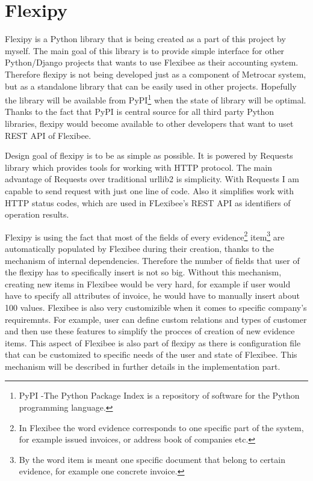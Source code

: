 \documentclass[11pt,twoside,a4paper]{book}
\begin{document}
\section{Flexipy}
Flexipy is a Python library that is being created as a part of this project by myself. The main goal of this library is to provide simple interface for other Python/Django projects that wants to use Flexibee as their accounting system. Therefore flexipy is not being developed just as a component of Metrocar system, but as a standalone library that can be easily used in other projects. Hopefully the library will be available from PyPI\footnote{PyPI -The Python Package Index is a repository of software for the Python programming language.} when the state of library will be optimal. Thanks to the fact that PyPI is central source for all third party Python libraries, flexipy would become available to other developers that want to uset REST API of Flexibee. 

Design goal of flexipy is to be as simple as possible. It is powered by Requests library\cite{requests} which provides tools for working with HTTP protocol. The main advantage of Requests over traditional urllib2 is simplicity. With Requests I am capable to send request with just one line of code. Also it simplifies work with HTTP status codes, which are used in FLexibee's REST API as identifiers of operation results.

Flexipy is using the fact that most of the fields of every evidence\footnote{In Flexibee the word evidence corresponds to one specific part of the system, for example issued invoices, or address book of companies etc.} item\footnote{By the word item is meant one specific document that belong to certain evidence, for example one concrete invoice.} are automatically populated by Flexibee during their creation, thanks to the mechanism of internal dependencies\cite{flexDep}. Therefore the number of fields that user of the flexipy has to specifically insert is not so big. Without this mechanism, creating new items in Flexibee would be very hard, for example if user would have to specify all attributes of invoice, he would have to manually insert about 100 values. Flexibee is also very customizible when it comes to specific company's requiremnts. For example, user can define custom relations and types of customer and then use these features to simplify the procces of creation of new evidence items. This aspect of Flexibee is also part of flexipy as there is configuration file that can be customized to specific needs of the user and state of Flexibee. This mechanism will be described in further details in the implementation part. 
\end{document}
